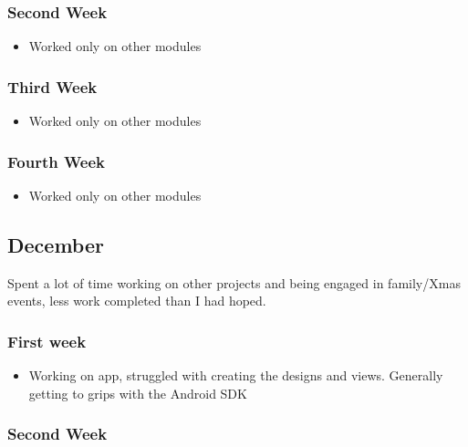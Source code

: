 \subsubsection{Second Week}\label{second-week-1}

\begin{itemize}
\tightlist
\item
  Worked only on other modules
\end{itemize}

\subsubsection{Third Week}\label{third-week}

\begin{itemize}
\tightlist
\item
  Worked only on other modules
\end{itemize}

\subsubsection{Fourth Week}\label{fourth-week}

\begin{itemize}
\tightlist
\item
  Worked only on other modules
\end{itemize}

\subsection{December}\label{december}

Spent a lot of time working on other projects and being engaged in
family/Xmas events, less work completed than I had hoped.

\subsubsection{First week}\label{first-week-2}

\begin{itemize}
\tightlist
\item
  Working on app, struggled with creating the designs and views.
  Generally getting to grips with the Android SDK
\end{itemize}

\subsubsection{Second Week}\label{second-week-2}


